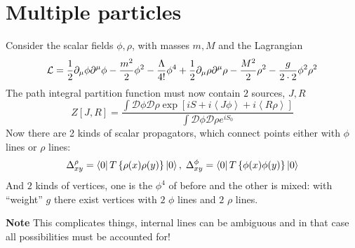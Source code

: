 \section{Multiple particles}
Consider the scalar fields $\phi,\rho$, with masses $m,M$ and the Lagrangian
\[
    \mathcal{L} = \frac{1}{2}\partial_\mu\phi \partial^\mu\phi -\frac{m^2}{2}\phi ^2
    -\frac{\Lambda }{4!}\phi ^4 + \frac{1}{2}\partial_\mu\rho \partial^\mu\rho -
    \frac{M^2}{2}\rho ^2 - \frac{g}{2\cdot 2}\phi^2\rho^2
\]
The path integral partition function must now contain $2$ sources, $J,R$
\[
    Z[J,R] = \frac{\int \mathcal{D}\phi \mathcal{D}\rho \exp\left[ iS +i
    \left\langle J\phi \right\rangle +i\left\langle R\rho \right\rangle \right]}
    {\int \mathcal{D}\phi \mathcal{D}\rho e^{iS_0}}
\]
Now there are 2 kinds of scalar propagators, which connect points either with
$\phi $ lines or $\rho $ lines:
\[
    \Delta^\rho_{xy}=\bra{0}T\left\{\rho(x)\rho (y)\right\}\ket{0},\;
    \Delta^\phi_{xy}=\bra{0}T\left\{\phi (x)\phi (y)\right\}\ket{0}
\]  
And $2$ kinds of vertices, one is the $\phi^4$ of before and the other is mixed:
with ``weight'' $g$ there exist vertices with $2$ $\phi$ lines and $2$ $\rho$
lines.

\textbf{Note} This complicates things, internal lines can be ambiguous and in that
case all possibilities must be accounted for!
